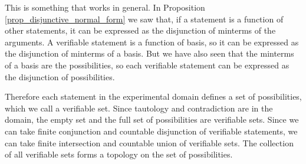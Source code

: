 \documentclass[11pt,letterpaper,fleqn]{memoir} %
\begin{document}
This is something that works in general. In Proposition \ref{prop_disjunctive_normal_form} we saw that, if a statement is a function of other statements, it can be expressed as the disjunction of minterms of the arguments. A verifiable statement is a function of basis, so it can be expressed as the disjunction of minterms of a basis. But we have also seen that the minterms of a basis are the possibilities, so each verifiable statement can be expressed as the disjunction of possibilities.


Therefore each statement in the experimental domain defines a set of possibilities, which we call a verifiable set. Since tautology and contradiction are in the domain, the empty set and the full set of possibilities are verifiable sets. Since we can take finite conjunction and countable disjunction of verifiable statements, we can take finite intersection and countable union of verifiable sets. The collection of all verifiable sets forms a topology on the set of possibilities.
\end{document}
